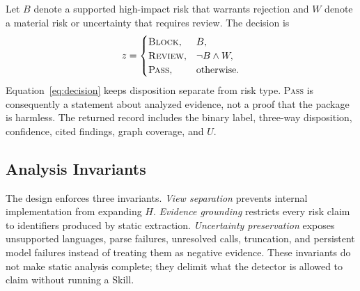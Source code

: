 Let $B$ denote a supported high-impact risk that warrants rejection and $W$
denote a material risk or uncertainty that requires review. The decision is
\begin{equation}
z=\begin{cases}
\textsc{Block}, & B,\\
\textsc{Review}, & \neg B\land W,\\
\textsc{Pass}, & \text{otherwise}.
\end{cases}
\label{eq:decision}
\end{equation}
Equation~\ref{eq:decision} keeps disposition separate from risk type.
\textsc{Pass} is consequently a statement about analyzed evidence, not a proof
that the package is harmless. The returned record includes the binary label,
three-way disposition, confidence, cited findings, graph coverage, and $U$.

\subsection{Analysis Invariants}

The design enforces three invariants. \emph{View separation} prevents internal
implementation from expanding $H$. \emph{Evidence grounding} restricts every
risk claim to identifiers produced by static extraction. \emph{Uncertainty
preservation} exposes unsupported languages, parse failures, unresolved calls,
truncation, and persistent model failures instead of treating them as negative
evidence. These invariants do not make static analysis complete; they delimit
what the detector is allowed to claim without running a Skill.
